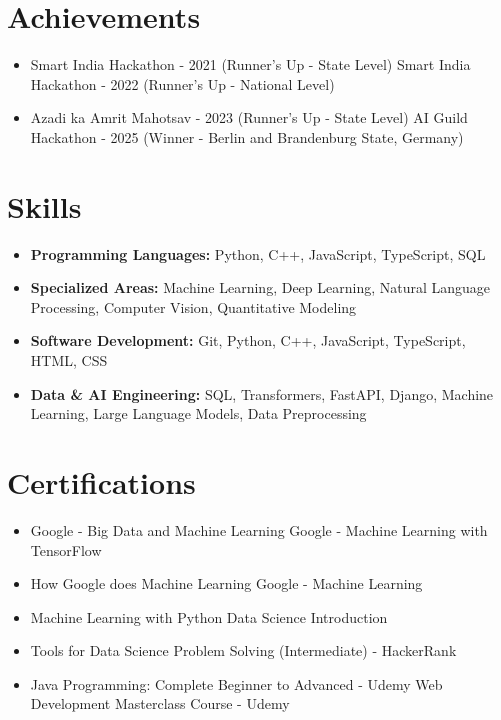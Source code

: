 \documentclass[a4paper,10pt]{article}
\begin{document}
\section*{Achievements}
\begin{itemize}
\item Smart India Hackathon - 2021 (Runner's Up - State Level) \hfill Smart India Hackathon - 2022 (Runner's Up - National Level)
\item Azadi ka Amrit Mahotsav - 2023 (Runner's Up - State Level) \hfill AI Guild Hackathon - 2025 (Winner - Berlin and Brandenburg State, Germany)
\end{itemize}

\section*{Skills}
\begin{itemize}
  \item \textbf{Programming Languages:} Python, C++, JavaScript, TypeScript, SQL
  \item \textbf{Specialized Areas:} Machine Learning, Deep Learning, Natural Language Processing, Computer Vision, Quantitative Modeling
  \item \textbf{Software Development:} Git, Python, C++, JavaScript, TypeScript, HTML, CSS
  \item \textbf{Data \& AI Engineering:} SQL, Transformers, FastAPI, Django, Machine Learning, Large Language Models, Data Preprocessing
\end{itemize}

\section*{Certifications}
\begin{itemize}
\item Google - Big Data and Machine Learning \hfill Google - Machine Learning with TensorFlow
\item How Google does Machine Learning \hfill Google - Machine Learning
\item Machine Learning with Python \hfill Data Science Introduction
\item Tools for Data Science \hfill Problem Solving (Intermediate) - HackerRank
\item Java Programming: Complete Beginner to Advanced - Udemy \hfill Web Development Masterclass Course - Udemy
\end{itemize}
\end{document}
